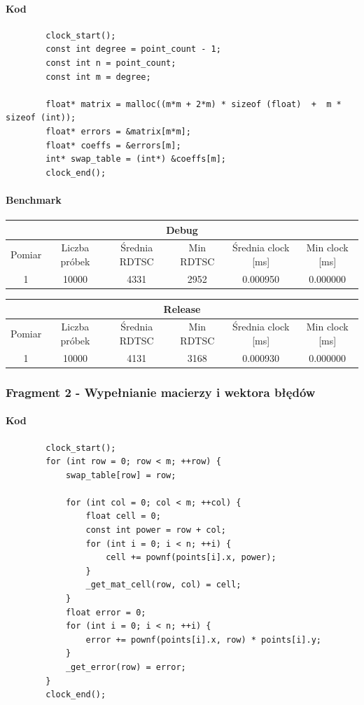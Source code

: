 \documentclass{article}
\begin{document}
	\paragraph{Kod}
	\begin{verbatim}
		clock_start();
		const int degree = point_count - 1;
		const int n = point_count;
		const int m = degree;
		
		float* matrix = malloc((m*m + 2*m) * sizeof (float)  +  m * sizeof (int));
		float* errors = &matrix[m*m];
		float* coeffs = &errors[m];
		int* swap_table = (int*) &coeffs[m];
		clock_end();
	\end{verbatim}
	
	\paragraph{Benchmark}
	\begin{center}
		\begin{tabular}{|c|c|c|c|c|c|} \hline
			\multicolumn{6}{|c|}{Debug} \\\hline
			Pomiar  & Liczba próbek & Średnia RDTSC & Min RDTSC & Średnia clock [ms] & Min clock [ms] \\\hline
			\hline
			1 & 10000 & 4331 & 2952 & 0.000950 & 0.000000 \\\hline
			
		\end{tabular}
	\end{center}
	\begin{center}
		\begin{tabular}{|c|c|c|c|c|c|} \hline
			\multicolumn{6}{|c|}{Release} \\\hline
			Pomiar  & Liczba próbek & Średnia RDTSC & Min RDTSC & Średnia clock [ms] & Min clock [ms] \\\hline
			\hline
			1 & 10000 & 4131 & 3168 & 0.000930 & 0.000000 \\\hline
			
		\end{tabular}
	\end{center}
	
	
	\pagebreak
	\subsubsection{Fragment 2 - Wypełnianie macierzy i wektora błędów}
	\paragraph{Kod}
	\begin{verbatim}
		clock_start();
		for (int row = 0; row < m; ++row) {
			swap_table[row] = row;
			
			for (int col = 0; col < m; ++col) {
				float cell = 0;
				const int power = row + col;
				for (int i = 0; i < n; ++i) {
					cell += pownf(points[i].x, power);
				}
				_get_mat_cell(row, col) = cell;
			}
			float error = 0;
			for (int i = 0; i < n; ++i) {
				error += pownf(points[i].x, row) * points[i].y;
			}
			_get_error(row) = error;
		}
		clock_end();
	\end{verbatim}
	
\end{document}
